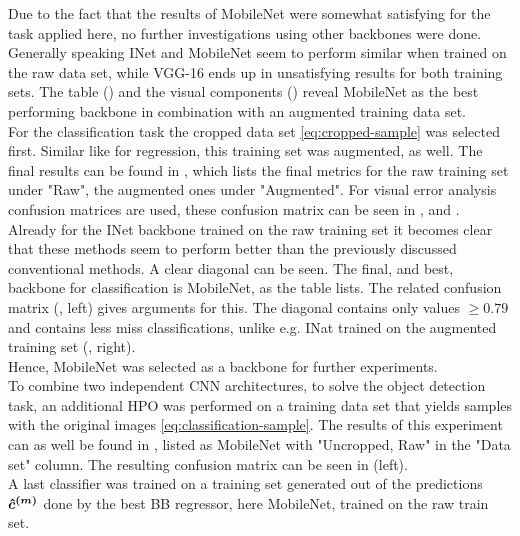 Due to the fact that the results of MobileNet were somewhat satisfying for the task applied here, no further investigations using other backbones were done.
Generally speaking INet and MobileNet seem to perform similar when trained on the raw data set, while VGG-16 ends up in unsatisfying results for both training sets.
The table () and the visual components () reveal MobileNet as the best performing backbone in combination with an augmented training data set.\\
For the classification task the cropped data set \eqref{eq:cropped-sample} was selected first.
Similar like for regression, this training set was augmented, as well.
The final results can be found in , which lists the final metrics for the raw training set under "Raw", the augmented ones under "Augmented".
For visual error analysis confusion matrices are used, these confusion matrix can be seen in ,  and .
Already for the INet backbone trained on the raw training set it becomes clear that these methods seem to perform better than the previously discussed conventional methods.
A clear diagonal can be seen.
The final, and best, backbone for classification is MobileNet, as the table lists.
The related confusion matrix (, left) gives arguments for this. The diagonal contains only values $\geq 0.79$ and contains less miss classifications, unlike e.g. INat trained on the augmented training set (, right).\\
Hence, MobileNet was selected as a backbone for further experiments.\\\newline
To combine two independent CNN architectures, to solve the object detection task, an additional HPO was performed on a training data set that yields samples with the original images \eqref{eq:classification-sample}.
The results of this experiment can as well be found in , listed as MobileNet with "Uncropped, Raw" in the "Data set" column.
The resulting confusion matrix can be seen in  (left).\\
A last classifier was trained on a training set generated out of the predictions $\bm{\hat{c}^{(m)}}$ done by the best BB regressor, here MobileNet, trained on the raw train set.
